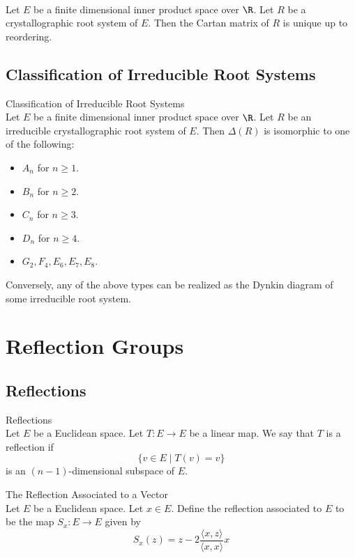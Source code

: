 \documentclass[a4paper]{article}
\begin{document}
\begin{prp}{}{} \\Let $E$ be a finite dimensional inner product space over $\R$. Let $R$ be a crystallographic root system of $E$. Then the Cartan matrix of $R$ is unique up to reordering. 
\end{prp}

\subsection{Classification of Irreducible Root Systems}
\begin{thm}{Classification of Irreducible Root Systems}{} \\Let $E$ be a finite dimensional inner product space over $\R$. Let $R$ be an irreducible crystallographic root system of $E$. Then $\Delta(R)$ is isomorphic to one of the following: 
\begin{itemize}
\item $A_n$ for $n\geq 1$. 
\item $B_n$ for $n\geq 2$. 
\item $C_n$ for $n\geq 3$. 
\item $D_n$ for $n\geq 4$. 
\item $G_2,F_4,E_6,E_7,E_8$. 
\end{itemize}
Conversely, any of the above types can be realized as the Dynkin diagram of some irreducible root system. 
\end{thm}



\pagebreak
\section{Reflection Groups}
\subsection{Reflections}
\begin{defn}{Reflections}{}\\
Let $E$ be a Euclidean space. Let $T:E\to E$ be a linear map. We say that $T$ is a reflection if $$\{v\in E\;|\;T(v)=v\}$$ is an $(n-1)$-dimensional subspace of $E$. 
\end{defn}

\begin{defn}{The Reflection Associated to a Vector}{}\\
Let $E$ be a Euclidean space. Let $x\in E$. Define the reflection associated to $E$ to be the map $S_x:E\to E$ given by $$S_x(z)=z-2\frac{\langle x,z\rangle}{\langle x,x\rangle}x$$
\end{defn}
\end{document}
